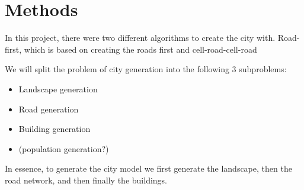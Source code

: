 \section{Methods}
In this project, there were two different algorithms to create the city with.
Road-first, which is based on creating the roads first and cell-road-cell-road 

We will split the problem of city generation into the following 3 subproblems:
\begin{itemize}
  \item Landscape generation
  \item Road generation
  \item Building generation
  \item (population generation?)
\end{itemize}

In essence, to generate the city model we first generate the landscape, then the road network, and then finally the buildings. 

